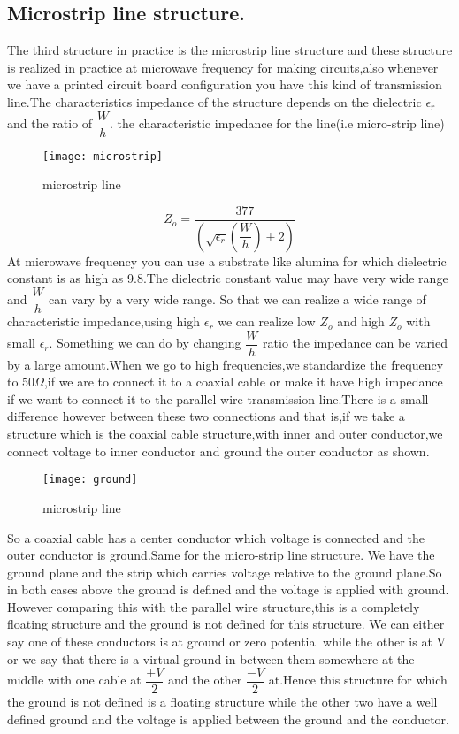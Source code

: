 \subsection{Microstrip line structure.}
The third structure in practice is the microstrip line structure and these  structure is realized in practice at microwave frequency for making circuits,also whenever we have a printed circuit board configuration you have this kind of transmission line.The characteristics impedance of the structure depends on the dielectric $\epsilon_{r}$ and the ratio of $\dfrac{W}{h}$. the characteristic impedance for the line(i.e micro-strip line)
\begin{figure}[h]
	\centering
	\texttt{[image: microstrip]}
	\caption{microstrip line}
\end{figure}
\begin{equation*}
Z_o=\dfrac{377}{(\sqrt{\epsilon_r}( \dfrac{W}{h})+2)}
\end{equation*}
At microwave frequency you can use a substrate like alumina for which dielectric constant is as high as 9.8.The dielectric constant value may have very wide range and $\dfrac{W}{h}$ can vary by a very wide range. So that we can realize a wide range of characteristic impedance,using high $\epsilon_r$ we can realize low $Z_o$ and high $Z_o$ with small $\epsilon_r$.
Something we can do by changing $\dfrac{W}{h}$ ratio the impedance can be varied by a large amount.When we go to high frequencies,we standardize the frequency to  $50\Omega$,if we are to connect it to a coaxial cable or make it have high impedance if we want to connect it to the parallel wire transmission line.There is a small difference however between these two connections and that is,if we take a structure which is the coaxial cable structure,with inner and outer conductor,we connect voltage to inner conductor and ground the outer conductor as shown.\\
\begin{figure}[h]
	\centering
	\texttt{[image: ground]}
	\caption{microstrip line}
\end{figure}
So a coaxial cable has a center conductor which voltage is connected and the outer conductor is ground.Same for the micro-strip line structure. 
We have the ground plane and the strip which carries voltage relative to the ground plane.So in both cases above the ground is defined and the voltage is applied with ground.
However comparing this with the parallel wire structure,this is a completely floating structure and the ground is not defined for this structure. We can either say one of these conductors is at ground or zero potential while the other is at V or we say that  there is a virtual ground in between them somewhere at the middle with one cable at $\dfrac{+V}{2}$ and the other $\dfrac{-V}{2}$ at.Hence this structure for which the ground is not defined is a floating structure while the other two have a well defined ground and the voltage is applied between the ground and the conductor.
